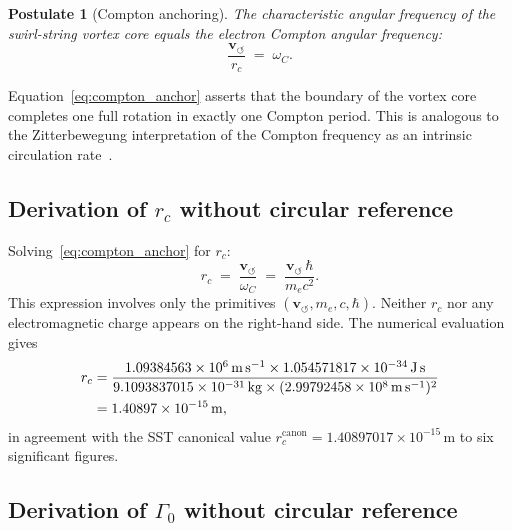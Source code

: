 \documentclass[11pt,a4paper]{article}
\newtheorem{postulate}{Postulate}
\newcommand{\rc}{r_c}
\newcommand{\vswirl}{\mathbf{v}_{\scriptscriptstyle\boldsymbol{\circlearrowleft}}}
\newcommand{\GammaZ}{\Gamma_0}
\newcommand{\omC}{\omega_C}
\begin{document}
\begin{postulate}[Compton anchoring]\label{post:compton}
The characteristic angular frequency of the swirl-string vortex core
equals the electron Compton angular frequency:
\begin{equation}
  \frac{\vswirl}{\rc} \;=\; \omC.
  \label{eq:compton_anchor}
\end{equation}
\end{postulate}

Equation~\eqref{eq:compton_anchor} asserts that the boundary of the
vortex core completes one full rotation in exactly one Compton period.
This is analogous to the Zitterbewegung interpretation of the Compton
frequency as an intrinsic circulation
rate~\cite{Hestenes1990zitterbewegung,Barut1981}.

\subsection{Derivation of $r_c$ without circular reference}

Solving~\eqref{eq:compton_anchor} for $\rc$:
\begin{equation}
  \boxed{
    \rc \;=\; \frac{\vswirl}{\omC}
    \;=\; \frac{\vswirl\,\hbar}{m_e c^2}.
  }
  \label{eq:rc_derived}
\end{equation}
This expression involves only the primitives $(\vswirl,m_e,c,\hbar)$.
Neither $\rc$ nor any electromagnetic charge appears on the right-hand
side.  The numerical evaluation gives
\begin{align}
  \rc &= \frac{1.09384563\times10^{6}\,\mathrm{m\,s^{-1}}
               \times 1.054571817\times10^{-34}\,\mathrm{J\,s}}
              {9.1093837015\times10^{-31}\,\mathrm{kg}
               \times (2.99792458\times10^{8}\,\mathrm{m\,s^{-1}})^2}
  \notag\\
  &= 1.40897\times10^{-15}\,\mathrm{m},
  \label{eq:rc_numerical}
\end{align}
in agreement with the SST canonical value
$\rc^{\mathrm{canon}}=1.40897017\times10^{-15}\,\mathrm{m}$
to six significant figures.

\subsection{Derivation of $\GammaZ$ without circular reference}
\end{document}
